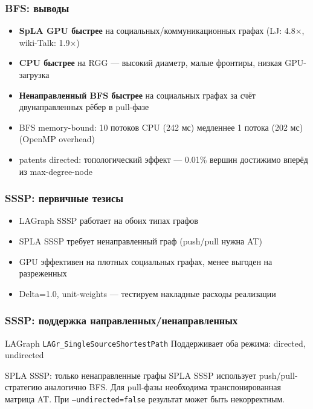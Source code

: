 \documentclass{beamer}
\begin{document}
\begin{frame}
  \frametitle{BFS: выводы}
  \begin{itemize}
    \item \textbf{SpLA GPU быстрее} на социальных/коммуникационных графах (LJ: 4.8×, wiki-Talk: 1.9×)
    \item \textbf{CPU быстрее} на RGG --- высокий диаметр, малые фронтиры, низкая GPU-загрузка
    \item \textbf{Ненаправленный BFS быстрее} на социальных графах за счёт двунаправленных рёбер в pull-фазе
	\item BFS memory-bound: 10 потоков CPU (242 мс) медленнее 1 потока (202 мс) (OpenMP overhead)
    \item patents directed: топологический эффект --- 0.01\% вершин достижимо вперёд из max-degree-node
  \end{itemize}
\end{frame}

\begin{frame}
  \frametitle{SSSP: первичные тезисы}
  \begin{itemize}
    \item LAGraph SSSP работает на обоих типах графов
    \item SPLA SSSP требует ненаправленный граф (push/pull нужна AT)
    \item GPU эффективен на плотных социальных графах, менее выгоден на разреженных
    \item Delta=1.0, unit-weights --- тестируем накладные расходы реализации
  \end{itemize}
\end{frame}

\begin{frame}[fragile]
  \frametitle{SSSP: поддержка направленных/ненаправленных}
  \begin{block}{LAGraph \texttt{LAGr\_SingleSourceShortestPath}}
    Поддерживает оба режима: directed, undirected
  \end{block}
  \begin{alertblock}{SPLA SSSP: только ненаправленные графы}
    SPLA SSSP использует push/pull-стратегию аналогично BFS.
    Для pull-фазы необходима транспонированная матрица AT.
    При \texttt{--undirected=false} результат может быть некорректным.
  \end{alertblock}
\end{frame}
\end{document}
